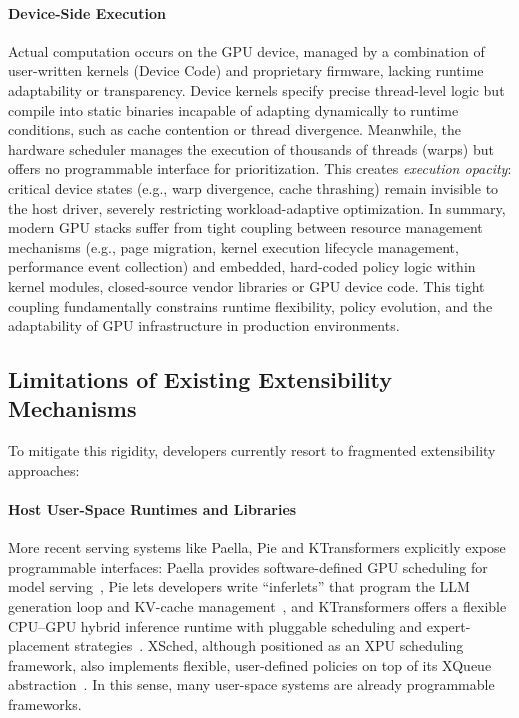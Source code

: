 \paragraph{Device-Side Execution}
Actual computation occurs on the GPU device, managed by a combination of user-written kernels (Device Code) and proprietary firmware, lacking runtime adaptability or transparency. Device kernels specify precise thread-level logic but compile into static binaries incapable of adapting dynamically to runtime conditions, such as cache contention or thread divergence. Meanwhile, the hardware scheduler manages the execution of thousands of threads (warps) but offers no programmable interface for prioritization. This creates \emph{execution opacity}: critical device states (e.g., warp divergence, cache thrashing) remain invisible to the host driver, severely restricting workload-adaptive optimization. In summary, modern GPU stacks suffer from tight coupling between resource management mechanisms (e.g., page migration, kernel execution lifecycle management, performance event collection) and embedded, hard-coded policy logic within kernel modules, closed-source vendor libraries or GPU device code. This tight coupling fundamentally constrains runtime flexibility, policy evolution, and the adaptability of GPU infrastructure in production environments.

\subsection{Limitations of Existing Extensibility Mechanisms}


To mitigate this rigidity, developers currently resort to fragmented extensibility approaches:

\paragraph{Host User-Space Runtimes and Libraries}
More recent serving systems like Paella, Pie and KTransformers explicitly expose programmable interfaces: Paella provides software-defined GPU scheduling for model serving~\cite{paella}, Pie lets developers write ``inferlets'' that program the LLM generation loop and KV-cache management~\cite{pie}, and KTransformers offers a flexible CPU--GPU hybrid inference runtime with pluggable scheduling and expert-placement strategies~\cite{ktransformers}. XSched, although positioned as an XPU scheduling framework, also implements flexible, user-defined policies on top of its XQueue abstraction~\cite{xsched}. In this sense, many user-space systems are already programmable frameworks.

